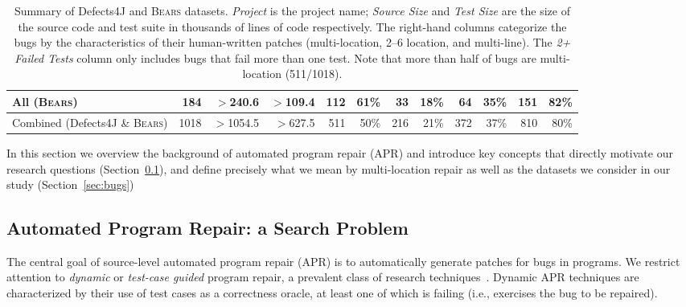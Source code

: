 \documentclass[10pt, conference]{IEEEtran}
\newcommand\bears{\textsc{Bears}\xspace}
\begin{document}
\begin{table}
\begin{center}
\begin{tabular}{l  rrr | rr rr rr rr }
\midrule
All (\bears) & 184 & $>$240.6 & $>$109.4 & 112 & 61\% & 33 & 18\% & 64 & 35\% & 151 & 82\% \\
\midrule
Combined (Defects4J \& \bears) & 1018 & $>$1054.5 & $>$627.5 & 511 & 50\% & 216 & 21\% & 372 & 37\% & 810 & 80\%\\
\bottomrule
\end{tabular}
\end{center}
\caption{\label{tab:dataset-characteristics} \small Summary of Defects4J and \bears
  datasets. \emph{Project} is the project name; \emph{Source Size} and
  \emph{Test Size} are the size of the source code and test suite in thousands
  of lines of code respectively. The right-hand columns categorize the bugs by
  the characteristics of their human-written patches (multi-location, 2--6
  location, and multi-line). The \emph{2+ Failed Tests} column only includes
  bugs that fail more than one test. Note that more than half of bugs are
  multi-location (511/1018).  }
\end{table}

In this section we overview the background of automated program repair (APR) and
introduce key concepts that directly motivate our research questions
(Section~\ref{sec:apr}), and define precisely what we mean by multi-location
repair as well as the datasets we consider in our study (Section~\ref{sec:bugs})

\subsection{Automated Program Repair: a Search Problem}
\label{sec:apr}

The central goal of source-level automated program repair (APR) is to
automatically generate patches for bugs in programs. We restrict attention to
\emph{dynamic} or \emph{test-case guided} program repair, a prevalent class of
research techniques~\cite{cacm19}.  Dynamic APR techniques
are characterized by their use of test cases as a correctness oracle,
at least one of which is failing (i.e., exercises the bug
to be repaired).
\end{document}
